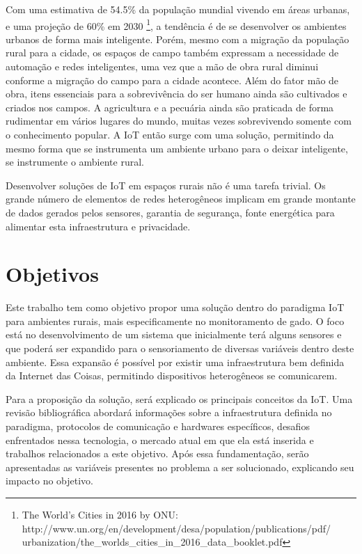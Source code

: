 \documentclass[
    hidelinks,
	12pt,				%
	openany,
	oneside, 
	a4paper,			%
	english,			%
	french,				%
	spanish,			%
	brazil				%
	]{abntex2}
\begin{document}
Com uma estimativa de 54.5\% da população mundial vivendo em áreas urbanas, e uma projeção de 60\% em 2030 \footnote{The World’s Cities in 2016 by ONU: http://www.un.org/en/development/desa/population/publications/pdf/\\urbanization/the\_worlds\_cities\_in\_2016\_data\_booklet.pdf}, a tendência é de se desenvolver os ambientes urbanos de forma mais inteligente. Porém, mesmo com a migração da população rural para a cidade, os espaços de campo também expressam a necessidade de automação e redes inteligentes, uma vez que a mão de obra rural diminui conforme a migração do campo para a cidade acontece. Além do fator mão de obra, itens essenciais para a sobrevivência do ser humano ainda são cultivados e criados nos campos. A agricultura e a pecuária ainda são praticada de forma rudimentar em vários lugares do mundo, muitas vezes sobrevivendo somente com o conhecimento popular. A IoT então surge com uma solução, permitindo da mesmo forma que se instrumenta um ambiente urbano para o deixar inteligente, se instrumente o ambiente rural. 

Desenvolver soluções de IoT em espaços rurais não é uma tarefa trivial. Os grande número de elementos de redes heterogêneos implicam em grande montante de dados gerados pelos sensores, garantia de segurança, fonte energética para alimentar esta infraestrutura e privacidade.

\section{Objetivos}

Este trabalho tem como objetivo propor uma solução dentro do paradigma IoT para ambientes rurais, mais especificamente no monitoramento de gado. O foco está no desenvolvimento de um sistema que inicialmente terá alguns sensores e que poderá ser  expandido para o sensoriamento de diversas variáveis dentro deste ambiente. Essa expansão é possível  por existir uma infraestrutura bem definida da Internet das Coisas, permitindo dispositivos heterogêneos se comunicarem.

Para a proposição da solução, será explicado os principais conceitos da IoT. Uma revisão bibliográfica abordará informações sobre a infraestrutura definida no paradigma, protocolos de comunicação e hardwares específicos, desafios enfrentados nessa tecnologia, o mercado atual em que ela está inserida e trabalhos relacionados a este objetivo. Após essa fundamentação, serão apresentadas as variáveis presentes no problema a ser solucionado, explicando seu impacto no objetivo.
\end{document}
